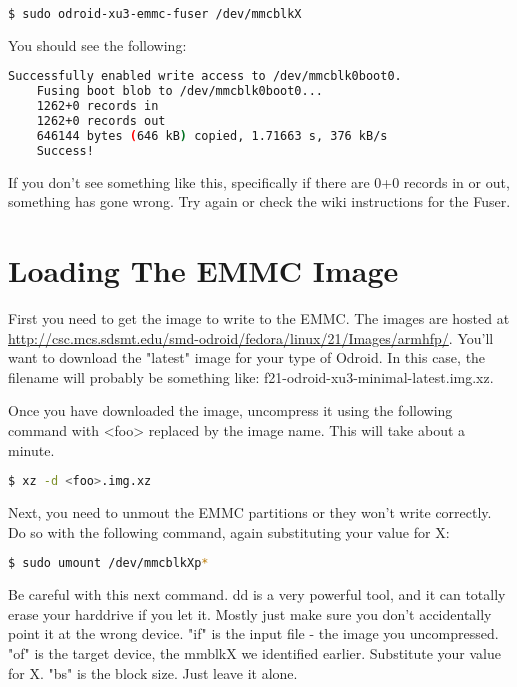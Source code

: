 \begin{lstlisting}[language=bash]
  $ sudo odroid-xu3-emmc-fuser /dev/mmcblkX
\end{lstlisting}

You should see the following:
\begin{lstlisting}[language=bash]
    Successfully enabled write access to /dev/mmcblk0boot0.
	Fusing boot blob to /dev/mmcblk0boot0...
	1262+0 records in
	1262+0 records out
	646144 bytes (646 kB) copied, 1.71663 s, 376 kB/s
	Success!
\end{lstlisting}

If you don't see something like this, specifically if there are 0+0 records in or out, something has gone wrong. Try again or check the wiki instructions for the Fuser.

\section{Loading The EMMC Image}

First you need to get the image to write to the EMMC. The images are hosted at \url{http://csc.mcs.sdsmt.edu/smd-odroid/fedora/linux/21/Images/armhfp/}. You'll want to download the "latest" image for your type of Odroid. In this case, the filename will probably be something like: f21-odroid-xu3-minimal-latest.img.xz.

Once you have downloaded the image, uncompress it using the following command with <foo> replaced by the image name. This will take about a minute.

\begin{lstlisting}[language=bash]
  $ xz -d <foo>.img.xz
\end{lstlisting}

Next, you need to unmout the EMMC partitions or they won't write correctly. Do so with the following command, again substituting your value for X:

\begin{lstlisting}[language=bash]
  $ sudo umount /dev/mmcblkXp*
\end{lstlisting}

Be careful with this next command. dd is a very powerful tool, and it can totally erase your harddrive if you let it. Mostly just make sure you don't accidentally point it at the wrong device. "if" is the input file - the image you uncompressed. "of" is the target device, the mmblkX we identified earlier. Substitute your value for X. "bs" is the block size. Just leave it alone.

